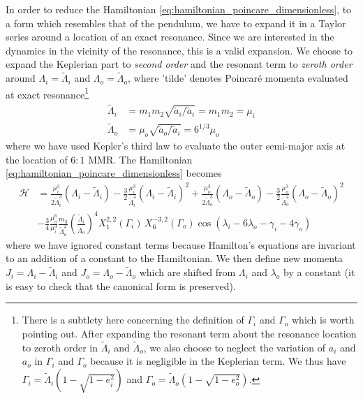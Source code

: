 In order to reduce the Hamiltonian \ref{eq:hamiltonian_poincare_dimensionless},
to a form which resembles that of the pendulum, we have to expand it in a 
Taylor series around a location of an exact resonance. Since we are interested
in the dynamics in the vicinity of the resonance, this is a valid expansion.
We choose to expand the Keplerian part to \emph{second order} and the
resonant term to \emph{zeroth order} around $\Lambda_i=\tilde{\Lambda}_i$ 
and $\Lambda_o=\tilde{\Lambda}_o$, where 'tilde' denotes Poincaré
momenta evaluated at exact resonance\footnote{There is a subtlety  here concerning the
definition of $\Gamma_i$ and $\Gamma_o$ which is worth pointing out. After expanding the
resonant term about the resonance location to zeroth order in 
$\tilde{\Lambda}_i$ and $\tilde{\Lambda}_o$, we also choose to neglect
the variation of $a_i$ and $a_o$ in $\Gamma_i$ and $\Gamma_o$
because it is negligible in the Keplerian term. 
We thus have $\Gamma_i=\tilde{\Lambda}_i\left(1-\sqrt{1-e_i^2}\right)$ and
$\Gamma_o=\tilde{\Lambda}_o\left(1-\sqrt{1-e_o^2}\right)$.}
\begin{equation}
    \begin{align}
        \tilde{\Lambda}_i&=m_1m_2\sqrt{\tilde{a}_i/\tilde{a}_i}=m_1m_2=\mu_i\\
        \tilde{\Lambda}_o&=\mu_o\sqrt{\tilde{a}_o/\tilde{a}_i}=6^{1/3}\mu_o
    \end{align}
\end{equation}
where we have used Kepler's third law to evaluate the outer semi-major axis
at the location of $6:1$ MMR. The Hamiltonian 
\ref{eq:hamiltonian_poincare_dimensionless} becomes
\begin{equation}
    \begin{aligned}
        \mathcal{H}&=\frac{\mu_i^3}{2\tilde{\Lambda}_i^3}
        (\Lambda_i-\tilde{\Lambda}_i) - \frac{3}{2}
        \frac{\mu_i^3}{\tilde{\Lambda}_i^4} (\Lambda_i-\tilde{\Lambda}_i)^2+
    \frac{\mu_o^3}{2\tilde{\Lambda}_o^3}
        (\Lambda_o-\tilde{\Lambda}_o) - \frac{3}{2}
        \frac{\mu_o^3}{\tilde{\Lambda}_o^4} (\Lambda_o-\tilde{\Lambda}_o)^2\\
        &-\frac{3}{4} \frac{\mu_o^6}{\mu_i^3} 
        \frac{m_3}{\tilde{\Lambda}_o^2} \left(\frac{\tilde{\Lambda}_i}
        {\tilde{\Lambda}_o}\right)^4
    X^{2,2}_1(\Gamma_i)\,X^{-3,2}_6(\Gamma_o)\cos(\lambda_i-6\lambda_o
    -\gamma_i - 4\gamma_o)
    \end{aligned}
    \label{eq:hamiltonian_poincare_dimensionless_expanded}
\end{equation}
where we have ignored constant terms because Hamilton's equations are invariant
to an addition of a constant to the Hamiltonian. We then define new momenta
$J_i=\Lambda_i-\tilde{\Lambda}_i$ and $J_o=\Lambda_o-\tilde{\Lambda}_o$ 
which are shifted from $\Lambda_i$ and $\lambda_o$ by a constant (it is easy 
to check that the canonical form is preserved).

